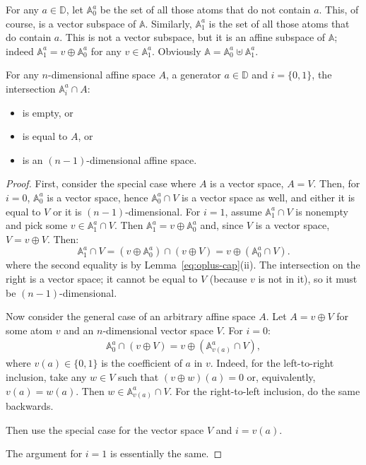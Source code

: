 \documentclass{theoretics}
\newcommand{\D}{{\mathbb D}}
\newcommand{\atoms}{\mathbb A}
\begin{document}
For any $a\in\D$, let $\atoms^a_0$ be the set of all those atoms that do not contain $a$. This, of course, is a vector subspace of $\atoms$. Similarly, $\atoms^a_1$ is the set of all those atoms that do contain $a$. This is not a vector subspace, but it is an affine subspace of $\atoms$; indeed $\atoms^a_1=v\oplus\atoms^a_0$ for any $v\in\atoms^a_1$. Obviously $\atoms=\atoms^a_0\uplus\atoms^a_1$.

\begin{lemma}\label{lem:vvcapaff}
For any $n$-dimensional affine space $A$, a generator $a\in\D$ and $i=\{0,1\}$, the intersection $\atoms^a_i\cap A$:
\begin{itemize}
\item is empty, or
\item is equal to $A$, or
\item is an $(n-1)$-dimensional affine space.
\end{itemize}
\end{lemma}
\begin{proof}
First, consider the special case where $A$ is a vector space, $A=V$. Then, for $i=0$, $\atoms^a_0$ is a vector space, hence $\atoms^a_0\cap V$ is a vector space as well, and either it is equal to $V$ or it is $(n-1)$-dimensional. For $i=1$, assume $\atoms^a_1\cap V$ is nonempty and pick some $v\in \atoms^a_1\cap V$. Then $\atoms^a_1=v\oplus\atoms^a_0$ and, since $V$ is a vector space, $V=v\oplus V$. Then:
\[
	\atoms^a_1\cap V = (v\oplus\atoms^a_0)\cap (v\oplus V) =
	v\oplus(\atoms^a_0\cap V).
\]
where the second equality is by Lemma~\ref{eq:oplus-cap}(ii).
The intersection on the right is a vector space; it cannot be equal to $V$ (because $v$ is not in it), so it must be $(n-1)$-dimensional.

Now consider the general case of an arbitrary affine space $A$. Let $A=v\oplus V$ for some atom $v$ and an $n$-dimensional vector space $V$. For $i=0$:
\begin{align*}\label{eq:capoplus}
	\atoms^a_0\cap (v\oplus V) = v\oplus(\atoms^a_{v(a)}\cap V),
\end{align*}
where $v(a)\in\{0,1\}$ is the coefficient of $a$ in $v$.
Indeed, for the left-to-right inclusion, take any $w\in V$ such that $(v\oplus w)(a)=0$ or, equivalently, $v(a)=w(a)$. Then $w\in\atoms^a_{v(a)}\cap V$. For the right-to-left inclusion, do the same backwards.

Then use the special case for the vector space $V$ and $i=v(a)$.

The argument for $i=1$ is essentially the same.
\end{proof}
\end{document}
